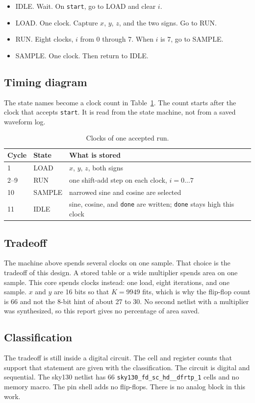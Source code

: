\documentclass[11pt,a4paper]{article}
\begin{document}
\begin{itemize}
  \item IDLE. Wait. On \texttt{start}, go to LOAD and clear \(i\).
  \item LOAD. One clock. Capture \(x\), \(y\), \(z\), and the two signs. Go to RUN.
  \item RUN. Eight clocks, \(i\) from 0 through 7. When \(i\) is 7, go to SAMPLE.
  \item SAMPLE. One clock. Then return to IDLE.
\end{itemize}

\subsection{Timing diagram}
The state names become a clock count in Table~\ref{tab:cycles}. The count starts after the clock that accepts \texttt{start}. It is read from the state machine, not from a saved waveform log.

\begin{table}[ht]
\centering
\caption{Clocks of one accepted run.}
\label{tab:cycles}
\begin{tabular}{lll}
\toprule
Cycle & State & What is stored \\
\midrule
1 & LOAD & \(x\), \(y\), \(z\), both signs \\
2--9 & RUN & one shift-add step on each clock, \(i = 0 \ldots 7\) \\
10 & SAMPLE & narrowed sine and cosine are selected \\
11 & IDLE & sine, cosine, and \texttt{done} are written; \texttt{done} stays high this clock \\
\bottomrule
\end{tabular}
\end{table}

\subsection{Tradeoff}
The machine above spends several clocks on one sample. That choice is the tradeoff of this design. A stored table or a wide multiplier spends area on one sample. This core spends clocks instead: one load, eight iterations, and one sample. \(x\) and \(y\) are 16 bits so that \(K = 9949\) fits, which is why the flip-flop count is 66 and not the 8-bit hint of about 27 to 30. No second netlist with a multiplier was synthesized, so this report gives no percentage of area saved.

\subsection{Classification}
The tradeoff is still inside a digital circuit. The cell and register counts that support that statement are given with the classification. The circuit is digital and sequential. The sky130 netlist has 66 \texttt{sky130\_fd\_sc\_hd\_\_dfrtp\_1} cells and no memory macro. The pin shell adds no flip-flops. There is no analog block in this work.
\end{document}
